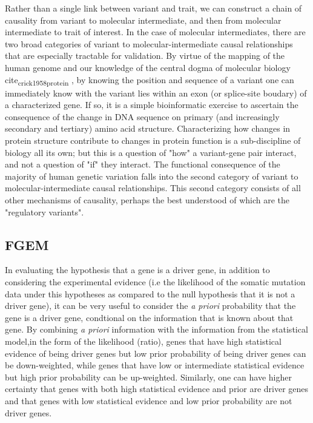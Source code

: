 Rather than a single link between variant and trait, we can construct a chain of causality from variant to molecular intermediate, and then from molecular intermediate to trait
of interest.  In the case of molecular intermediates, there are two broad categories of variant to molecular-intermediate causal relationships that are especially tractable for 
validation.  By virtue of the mapping of the human genome and our knowledge of the central dogma of molecular biology cite\textsubscript{crick1958protein} , by knowing the position and sequence
of a variant one can immediately know with the variant lies within an exon (or splice-site boudary) of a characterized gene.  If so, it is a simple bioinformatic exercise to 
ascertain the consequence of the change in DNA sequence on primary (and increasingly secondary and tertiary) amino acid structure.  Characterizing how changes in protein
structure contribute to changes in protein function is a sub-discipline of biology all its own; but this is a question of "how" a variant-gene pair interact, and not a question of 
"if" they interact.  The functional consequence of the majority of human genetic variation falls into the second category of variant to molecular-intermediate causal relationships.  
This second category consists of all other mechanisms of causality, perhaps the best understood of which are the "regulatory variants". 


\subsection{FGEM}


In evaluating the hypothesis that a gene is a driver gene, in addition to considering the experimental evidence (i.e the likelihood of the somatic mutation data under this hypotheses as compared to the null hypothesis that it is not a driver gene), it can be very useful to consider the \emph{a priori} probability that the gene is a driver gene, condtional on the information that is known about that gene.  By combining \emph{a priori} information with the information from the statistical model,in the form of the likelihood (ratio), genes that have high statistical evidence of being driver genes but low prior probability of being driver genes can be down-weighted, while genes that have low or intermediate statistical evidence but high prior probability can be up-weighted.  Similarly, one can have higher certainty that genes with  both high statistical evidence and prior are driver genes and that genes with low statistical evidence and low prior probability are not driver genes.


